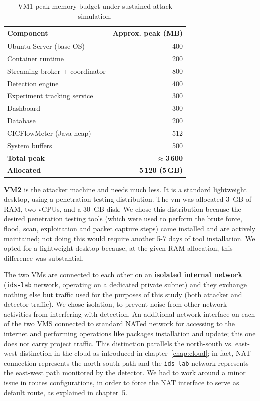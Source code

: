 \begin{table}[H]
  \centering
  \caption{VM1 peak memory budget under sustained attack simulation.}
  \label{tab:vm1_ram}
  \renewcommand{\arraystretch}{1.3}
  \begin{tabular}{lr}
    \toprule
    \textbf{Component} & \textbf{Approx. peak (MB)} \\
    \midrule
    Ubuntu Server (base OS)      & 400 \\
    Container runtime            & 200 \\
    Streaming broker + coordinator & 800 \\
    Detection engine             & 400 \\
    Experiment tracking service  & 300 \\
    Dashboard                    & 300 \\
    Database                     & 200 \\
    CICFlowMeter (Java heap)     & 512 \\
    System buffers               & 500 \\
    \midrule
    \textbf{Total peak}          & \textbf{$\approx$3\,600} \\
    \textbf{Allocated}           & \textbf{5\,120 (5\,GB)} \\
    \bottomrule
  \end{tabular}
\end{table}

\textbf{VM2} is the attacker machine and needs much less. It is a standard lightweight desktop, using a penetration testing distribution. The vm was allocated 3~GB of RAM, two vCPUs, and a 30~GB disk. 
We chose this distribution because the desired penetration testing tools (which were used to perform the brute force, flood, scan, exploitation and packet capture steps) came installed and are actively maintained; not doing this would require another 5-7 days of tool installation. 
We opted for a lightweight desktop because, at the given RAM allocation, this difference was substantial.

The two VMs are connected to each other on an \textbf{isolated internal network} (\texttt{ids-lab} network, operating on a dedicated private subnet) and they exchange nothing else but traffic used for the purposes of this study (both attacker and detector traffic). We chose isolation, to prevent noise from other network activities from interfering with detection. An additional network interface on each of the two VMS connected to standard NATed network for accessing to the internet and performing operations like packages installation and update; this one does not carry project traffic. 
This distinction parallels the north-south vs. east-west distinction in the cloud as introduced in chapter~\ref{chap:cloud}; in fact, NAT connection represents the north-south path and the \texttt{ids-lab} network represents the east-west path monitored by the detector. 
We had to work around a minor issue in routes configurations, in order to force the NAT interface to serve as default route, as explained in chapter~5.

